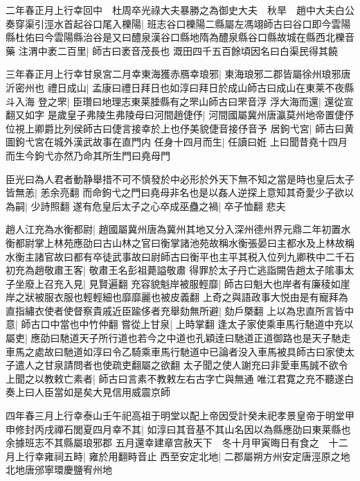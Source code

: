 二年春正月上行幸回中　杜周卒光祿大夫暴勝之為御史大夫　秋旱　趙中大夫白公奏穿渠引涇水首起谷口尾入櫟陽|{
	班志谷口櫟陽二縣屬左馮翊師古曰谷口即今雲陽縣杜佑曰今雲陽縣治谷是又曰醴泉漢谷口縣地隋為醴泉縣谷口縣故城在縣西北櫟音藥}
注渭中袤二百里|{
	師古曰袤音茂長也}
溉田四千五百餘頃因名曰白渠民得其饒

三年春正月上行幸甘泉宮二月幸東海獲赤鴈幸琅邪|{
	東海琅邪二郡皆屬徐州琅邪唐沂密州也}
禮日成山|{
	孟康曰禮日拜日也如淳曰拜日於成山師古曰成山在東莱不夜縣斗入海}
登之罘|{
	臣瓚曰地理志東莱腄縣有之罘山師古曰罘音浮}
浮大海而還|{
	還從宣翻又如字}
是歲皇子弗陵生弗陵母曰河間趙倢伃|{
	河間國屬冀州唐瀛莫州地帝置倢伃位視上卿爵比列侯師古曰倢言接幸於上也伃美貌倢音接伃音予}
居鉤弋宮|{
	師古曰黄圖鉤弋宮在城外漢武故事在直門内}
任身十四月而生|{
	任讀曰姙}
上曰聞昔堯十四月而生今鉤弋亦然乃命其所生門曰堯母門

臣光曰為人君者動静舉措不可不慎發於中必形於外天下無不知之當是時也皇后太子皆無恙|{
	恙余亮翻}
而命鉤弋之門曰堯母非名也是以姦人逆探上意知其奇愛少子欲以為嗣|{
	少詩照翻}
遂有危皇后太子之心卒成巫蠱之禍|{
	卒子恤翻}
悲夫

趙人江充為水衡都尉|{
	趙國屬冀州唐為冀州其地又分入深州德州界元鼎二年初置水衡都尉掌上林苑應劭曰古山林之官曰衡掌諸池苑故稱水衡張晏曰主都水及上林故稱水衡主諸官故曰都有卒徒武事故曰尉師古曰衡平也主平其税入位列九卿秩中二千石}
初充為趙敬肅王客|{
	敬肅王名彭祖薨謚敬肅}
得罪於太子丹亡逃詣闕告趙太子隂事太子坐廢上召充入見|{
	見賢遍翻}
充容貌魁岸被服輕靡|{
	師古曰魁大也岸者有廉稜如崖岸之狀被服衣服也輕輕細也靡靡麗也被皮義翻}
上奇之與語政事大悦由是有寵拜為直指繡衣使者使督察貴戚近臣踰侈者充舉劾無所避|{
	劾戶槩翻}
上以為忠直所言皆中意|{
	師古口中當也中竹仲翻}
嘗從上甘泉|{
	上時掌翻}
逢太子家使乘車馬行馳道中充以屬吏|{
	應劭曰馳道天子所行道也若今之中道也孔穎逹曰馳道正道御路也是天子馳走車馬之處故曰馳道如淳曰令乙騎乘車馬行馳道中已論者没入車馬被具師古曰家使太子遣人之甘泉請問者也使疏吏翻屬之欲翻}
太子聞之使人謝充曰非愛車馬誠不欲令上聞之以教敕亡素者|{
	師古曰言素不教敕左右古字亡與無通}
唯江君寛之充不聽遂白奏上曰人臣當如是矣大見信用威震京師

四年春三月上行幸泰山壬午祀高祖于明堂以配上帝因受計癸未祀孝景皇帝于明堂甲申修封丙戌禪石閭夏四月幸不其|{
	如淳曰其音基不其山名因以為縣應劭曰東莱縣也余據班志不其縣屬琅邪郡}
五月還幸建章宫赦天下　冬十月甲寅晦日有食之　十二月上行幸雍祠五畤|{
	雍於用翻畤音止}
西至安定北地|{
	二郡屬朔方州安定唐涇原之地北地唐邠寧環慶鹽宥州地}


